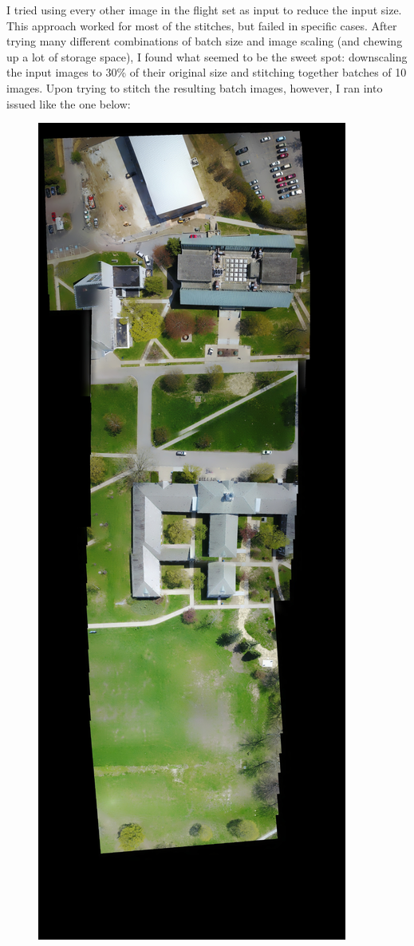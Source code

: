 I tried using every other image in the flight set as input to reduce the input size. This approach worked for most of the stitches, but failed in specific cases. After trying many different combinations of batch size and image scaling (and chewing up a lot of storage space), I found what seemed to be the sweet spot: downscaling the input images to 30\% of their original size and stitching together batches of 10 images. Upon trying to stitch the resulting batch images, however, I ran into issued like the one below:

\begin{figure}[htbp]
\centering
\includegraphics[keepaspectratio,width=\textwidth,height=0.75\textheight]{images/mavic_batches/failednestedbatch.JPG}

\end{figure}

